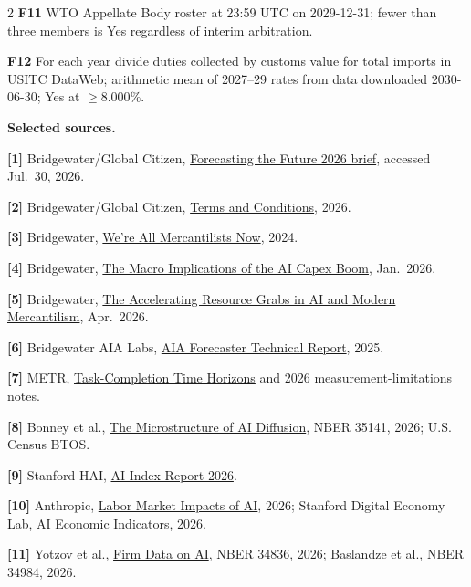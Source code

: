 \documentclass[10pt,letterpaper]{article}
\begin{document}
{\begin{multicols}{2}
\textbf{F11} WTO Appellate Body roster at 23:59 UTC on 2029-12-31; fewer than
three members is Yes regardless of interim arbitration.

\textbf{F12} For each year divide duties collected by customs value for total
imports in USITC DataWeb; arithmetic mean of 2027--29 rates from data
downloaded 2030-06-30; Yes at $\geq8.000\%$.

\columnbreak

\textbf{\color{accent}Selected sources.}

\textbf{[1]} Bridgewater/Global Citizen, \href{https://observatory.bwater.com/events/2026-forecasting-the-future}{Forecasting the Future 2026 brief}, accessed Jul.\ 30, 2026.

\textbf{[2]} Bridgewater/Global Citizen, \href{https://www.bridgewater.com/bridgewater-global-citizen-forecasting-the-future-a-modern-economics-challenge-2026-terms-conditions}{Terms and Conditions}, 2026.

\textbf{[3]} Bridgewater, \href{https://www.bridgewater.com/research-and-insights/were-all-mercantilists-now}{We're All Mercantilists Now}, 2024.

\textbf{[4]} Bridgewater, \href{https://www.bridgewater.com/research-and-insights/the-macro-implications-of-the-ai-capex-boom}{The Macro Implications of the AI Capex Boom}, Jan.\ 2026.

\textbf{[5]} Bridgewater, \href{https://www.bridgewater.com/the-accelerating-resource-grabs-in-ai-and-modern-mercantilism-content-ctd}{The Accelerating Resource Grabs in AI and Modern Mercantilism}, Apr.\ 2026.

\textbf{[6]} Bridgewater AIA Labs, \href{https://arxiv.org/abs/2511.07678}{AIA Forecaster Technical Report}, 2025.

\textbf{[7]} METR, \href{https://metr.org/time-horizons/}{Task-Completion Time Horizons} and 2026 measurement-limitations notes.

\textbf{[8]} Bonney et al., \href{https://www.nber.org/papers/w35141}{The Microstructure of AI Diffusion}, NBER 35141, 2026; U.S. Census BTOS.

\textbf{[9]} Stanford HAI, \href{https://hai.stanford.edu/ai-index/2026-ai-index-report}{AI Index Report 2026}.

\textbf{[10]} Anthropic, \href{https://www.anthropic.com/research/labor-market-impacts}{Labor Market Impacts of AI}, 2026; Stanford Digital Economy Lab, AI Economic Indicators, 2026.

\textbf{[11]} Yotzov et al., \href{https://www.nber.org/papers/w34836}{Firm Data on AI}, NBER 34836, 2026; Baslandze et al., NBER 34984, 2026.


\end{multicols}}
\end{document}
